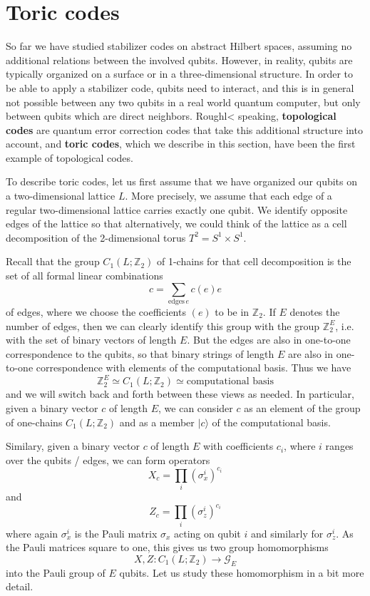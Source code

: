 \documentclass[a4paper, draft]{article}
\theoremstyle{own}
\theoremstyle{remark}
\newcommand{\Z}{\mathbb{Z}}
\begin{document}
\section{Toric codes}

So far we have studied stabilizer codes on abstract Hilbert spaces, assuming no additional relations between the involved qubits. However, in reality, qubits are typically organized on a surface or in a three-dimensional structure. In order to be able to apply a stabilizer code, qubits need to interact, and this is in general not possible between any two qubits in a real world quantum computer, but only between qubits which are direct neighbors. Roughl< speaking, {\bf topological codes} are quantum error correction codes that take this additional structure into account, and {\bf toric codes}, which we describe in this section, have been the first example of topological codes.

To describe toric codes, let us first assume that we have organized our qubits on a two-dimensional lattice $L$. More precisely, we assume that each edge of a regular two-dimensional lattice carries exactly one qubit. We identify opposite edges of the lattice so that alternatively, we could think of the lattice as a cell decomposition of the 2-dimensional torus $T^2 = S^1 \times S^1$. 

Recall that the group $C_1(L;\Z_2)$ of 1-chains for that cell decomposition is the set of all formal linear combinations
$$
c = \sum_{\text{edges} \, e} c(e) e
$$
of edges, where we choose the coefficients $(e)$ to be in $\Z_2$. If $E$ denotes the number of edges, then we can clearly identify this group with the group $\Z_2^E$, i.e. with the set of binary vectors of length $E$. But the edges are also in one-to-one correspondence to the qubits, so that binary strings of length $E$ are also in one-to-one correspondence with elements of the computational basis. Thus we have
$$
\Z_2^E \simeq C_1(L ; \Z_2) \simeq \text{computational basis}
$$
and we will switch back and forth between these views as needed. In particular, given a binary vector $c$ of length $E$, we can consider $c$ as an element of the group of one-chains $C_1(L; \Z_2)$ and as a member $|c \rangle$ of the computational basis. 

Similary, given a binary vector $c$ of length $E$ with coefficients $c_i$, where $i$ ranges over the qubits / edges, we can form operators
$$
X_c = \prod_i (\sigma_{x}^i)^{c_i}
$$
and 
$$
Z_c = \prod_i (\sigma_{z}^i)^{c_i}
$$
where again $\sigma_x^i$ is the Pauli matrix $\sigma_x$ acting on qubit $i$ and similarly for $\sigma_z^i$. As the Pauli matrices square to one, this gives us two group homomorphisms
$$
X, Z \colon C_1(L;\Z_2) \rightarrow \mathcal{G}_E
$$
into the Pauli group of $E$ qubits. Let us study these homomorphism in a bit more detail.
\end{document}
